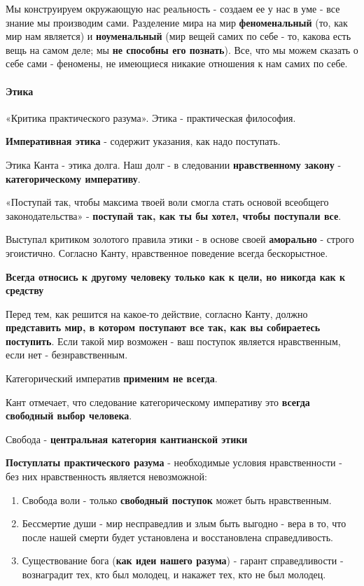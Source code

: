 \documentclass{article}
\begin{document}
\begin{flushleft}
Мы конструируем окружающую нас реальность - создаем ее у нас в уме - все знание мы производим сами. Разделение мира на мир \textbf{феноменальный} (то, как мир нам является) и \textbf{ноуменальный} (мир вещей самих по себе - то, какова есть вещь на самом деле; мы \textbf{не способны его познать}). Все, что мы можем сказать о себе сами - феномены, не имеющиеся никакие отношения к нам самих по себе.

\paragraph{Этика} «Критика практического разума». Этика - практическая философия.

\textbf{Императивная этика} - содержит указания, как надо поступать.

Этика Канта - этика долга. Наш долг - в следовании \textbf{нравственному закону} - \textbf{категорическому императиву}.

«Поступай так, чтобы максима твоей воли смогла стать основой всеобщего законодательства» - \textbf{поступай так, как ты бы хотел, чтобы поступали все}.

Выступал критиком золотого правила этики - в основе своей \textbf{аморально} - строго эгоистично. Согласно Канту, нравственное поведение всегда бескорыстное.

\textbf{Всегда относись к другому человеку только как к цели, но никогда как к средству}

\hfill

Перед тем, как решится на какое-то действие, согласно Канту, должно \textbf{представить мир, в котором поступают все так, как вы собираетесь поступить}. Если такой мир возможен - ваш поступок является нравственным, если нет - безнравственным.

Категорический императив \textbf{применим не всегда}.

Кант отмечает, что следование категорическому императиву это \textbf{всегда свободный выбор человека}.

Свобода - \textbf{центральная категория кантианской этики}

\textbf{Поступлаты практического разума} - необходимые условия нравственности - без них нравственность является невозможной:

\begin{enumerate}
    \item Свобода воли - только \textbf{свободный поступок} может быть нравственным.
    \item Бессмертие души - мир несправедлив и злым быть выгодно - вера в то, что после нашей смерти будет установлена и восстановлена справедливость.
    \item Существование бога (\textbf{как идеи нашего разума}) - гарант справедливости - вознаградит тех, кто был молодец, и накажет тех, кто не был молодец.
\end{enumerate}


\end{flushleft}
\end{document}
